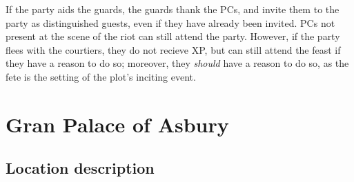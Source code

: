 \documentclass{report}
\theoremstyle{definition}
\begin{document}
If the party aids the guards, the guards thank the PCs, and invite them to the party as distinguished guests, even if they have already been invited.  PCs not present at the scene of the riot can still attend the party. However, if the party flees with the courtiers, they do not recieve XP, but can still attend the feast if they have a reason to do so; moreover, they \textit{should} have a reason to do so, as the fete is the setting of the plot's inciting event.

\chapter{Gran Palace of Asbury}
\section{Location description}
\end{document}
